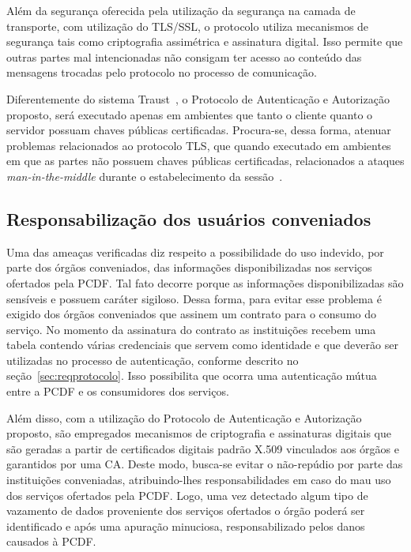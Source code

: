 Além da segurança oferecida pela utilização da segurança na camada de transporte, com utilização do TLS/SSL, o protocolo utiliza mecanismos de segurança tais como criptografia assimétrica e assinatura digital. Isso permite que outras partes mal intencionadas não consigam ter acesso ao conteúdo das mensagens trocadas pelo protocolo no processo de comunicação.

Diferentemente do sistema Traust~\cite{traust08}, o Protocolo de Autenticação e Autorização proposto, será executado apenas em ambientes que tanto o cliente quanto o servidor possuam chaves públicas certificadas. Procura-se, dessa forma, atenuar problemas relacionados ao protocolo TLS, que quando executado em ambientes em que as partes n\~{a}o possuem chaves públicas certificadas, relacionados a ataques \emph{man-in-the-middle} durante o estabelecimento da sessão~\cite{traust08}.

\subsection{Responsabilização dos usuários conveniados}

Uma das ameaças verificadas diz respeito a possibilidade do uso indevido, por parte dos órgãos conveniados, das informações disponibilizadas nos serviços ofertados pela PCDF. Tal fato decorre porque as informações disponibilizadas s\~{a}o sensíveis e possuem caráter sigiloso. Dessa forma, para evitar esse problema é exigido dos órgãos conveniados que assinem um contrato para o consumo do serviço. No momento da assinatura do contrato as institui\c c\~{o}es recebem uma tabela contendo várias credenciais que servem como identidade e que deverão ser utilizadas no processo de autenticação, conforme descrito no seção~\ref{sec:reqprotocolo}. Isso possibilita que ocorra uma autenticação mútua entre a PCDF e os consumidores dos serviços.

Além disso, com a utilização do Protocolo de Autenticação e Autorização proposto, são empregados mecanismos de criptografia e assinaturas digitais que são geradas a partir de certificados digitais padrão X.509 vinculados aos órgãos e garantidos por uma CA. Deste modo, busca-se evitar o não-repúdio por parte das instituições conveniadas, atribuindo-lhes responsabilidades em caso do mau uso dos serviços ofertados pela PCDF. Logo, uma vez detectado algum tipo de vazamento de dados proveniente dos serviços ofertados o órgão poderá ser identificado e após uma apuração minuciosa, responsabilizado pelos danos causados à PCDF.

